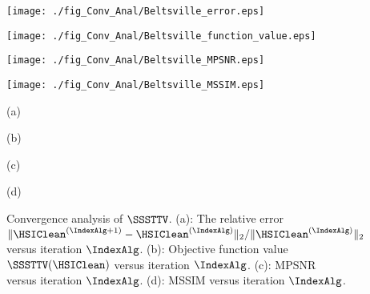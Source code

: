 \begin{figure*}[t]
\begin{center}
        \begin{minipage}{0.240\hsize}
        	\centerline{\texttt{[image: ./fig\_Conv\_Anal/Beltsville\_error.eps]}}
        \end{minipage}
        \begin{minipage}{0.240\hsize}
        	\centerline{\texttt{[image: ./fig\_Conv\_Anal/Beltsville\_function\_value.eps]}}
        \end{minipage}
        \begin{minipage}{0.240\hsize}
        	\centerline{\texttt{[image: ./fig\_Conv\_Anal/Beltsville\_MPSNR.eps]}}
        \end{minipage}
        \begin{minipage}{0.240\hsize}
        	\centerline{\texttt{[image: ./fig\_Conv\_Anal/Beltsville\_MSSIM.eps]}}
        \end{minipage}

        
        \begin{minipage}{0.005\hsize}
        	\centerline{\hspace{\hsize}} %
        \end{minipage}
        \begin{minipage}{0.240\hsize}
            \centerline{\small{(a)}}
		\end{minipage}
		\begin{minipage}{0.240\hsize}
			\centerline{\small{(b)}}
		\end{minipage}
		\begin{minipage}{0.240\hsize}
			\centerline{\small{(c)}}
		\end{minipage}
		\begin{minipage}{0.240\hsize}
			\centerline{\small{(d)}}
		\end{minipage}
    \end{center}
	
    \vspace{-3mm}
    \caption{Convergence analysis of $\SSSTTV$. (a): The relative error $\| \HSIClean^{(\IndexAlg+1)} - \HSIClean^{(\IndexAlg)} \|_2 / \| \HSIClean^{(\IndexAlg)}\|_{2}$ versus iteration $\IndexAlg$. (b): Objective function value $\SSSTTV(\HSIClean)$ versus iteration $\IndexAlg$. (c): MPSNR versus iteration $\IndexAlg$. (d): MSSIM  versus iteration $\IndexAlg$. }
    \label{fig:Conv_Anal}
\end{figure*}